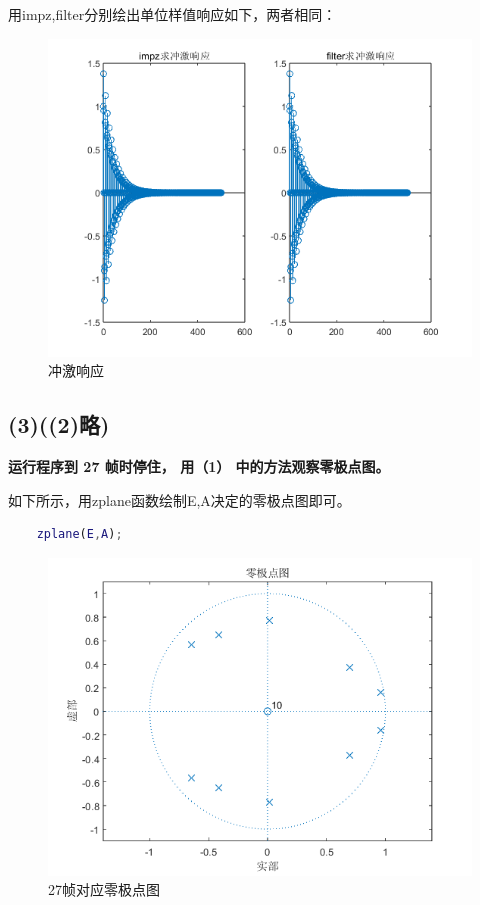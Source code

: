 \documentclass[10pt]{article}
\begin{document}
用impz,filter分别绘出单位样值响应如下，两者相同：
\begin{figure}[h]
	\centering
	\begin{minipage}{0.49\linewidth}
		\centering
		\includegraphics[width=0.9\linewidth]{drawing1-3.png}
		\caption{冲激响应}
	\end{minipage}
\end{figure}
\newpage
\subsection*{(3)((2)略)}
\textbf{运行程序到 27 帧时停住， 用（1） 中的方法观察零极点图。}

如下所示，用zplane函数绘制E,A决定的零极点图即可。
\begin{lstlisting}[language=matlab]
% (3) 在此位置写程序，观察预测系统的零极点图
    zplane(E,A);
    \end{lstlisting}

\begin{figure}[h]
	\centering
	\begin{minipage}{0.49\linewidth}
		\centering
		\includegraphics[width=0.9\linewidth]{coding1.png}
		\caption{27帧对应零极点图}
	\end{minipage}
\end{figure}
\end{document}
